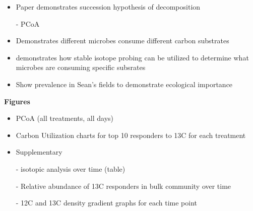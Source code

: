 \begin{itemize}
\item Paper demonstrates succession hypothesis of decomposition
     
     - PCoA
\item Demonstrates different microbes consume different carbon substrates
\item demonstrates how stable isotope probing can be utilized to determine what microbes are consuming specific subsrates
\item Show prevalence in Sean's fields to demonstrate ecological importance
\end{itemize}


\textbf{Figures}
\begin{itemize}
\item PCoA (all treatments, all days)
\item Carbon Utilization charts for top 10 responders to 13C for each treatment
\item Supplementary
      
      - isotopic analysis over time (table)

      - Relative abundance of 13C responders in bulk community over time

      - 12C and 13C density gradient graphs for each time point
 

\end{itemize}


